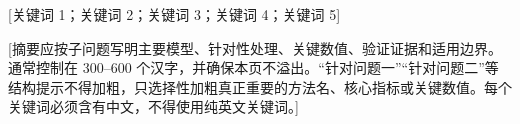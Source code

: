 \begin{cumcmabstract}{[关键词 1；关键词 2；关键词 3；关键词 4；关键词 5]}

[摘要应按子问题写明主要模型、针对性处理、关键数值、验证证据和适用边界。通常控制在 300--600 个汉字，并确保本页不溢出。“针对问题一”“针对问题二”等结构提示不得加粗，只选择性加粗真正重要的方法名、核心指标或关键数值。每个关键词必须含有中文，不得使用纯英文关键词。]

\end{cumcmabstract}
